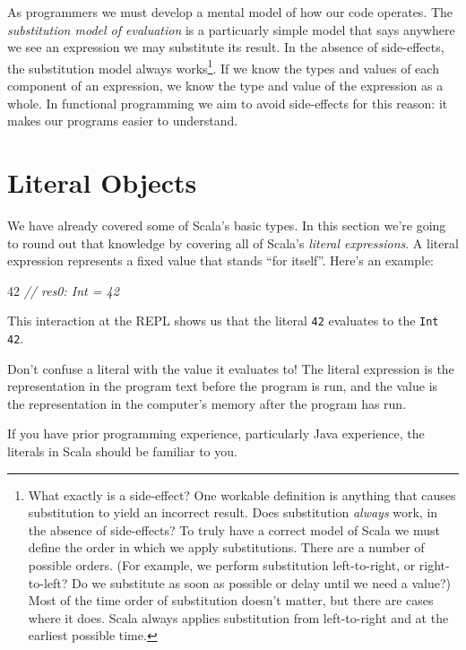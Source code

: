 \documentclass[11pt,a5paper,]{book}
\newenvironment{Shaded}{\begin{snugshade}}{\end{snugshade}}
\newcommand{\CommentTok}[1]{\textcolor[rgb]{0.56,0.35,0.01}{\textit{#1}}}
\newcommand{\DecValTok}[1]{\textcolor[rgb]{0.00,0.00,0.81}{#1}}
\begin{document}
As programmers we must develop a mental model of how our code operates.
The \emph{substitution model of evaluation} is a particuarly simple
model that says anywhere we see an expression we may substitute its
result. In the absence of side-effects, the substitution model always
works\footnote{What exactly is a side-effect? One workable definition is
  anything that causes substitution to yield an incorrect result. Does
  substitution \emph{always} work, in the absence of side-effects? To
  truly have a correct model of Scala we must define the order in which
  we apply substitutions. There are a number of possible orders. (For
  example, we perform substitution left-to-right, or right-to-left? Do
  we substitute as soon as possible or delay until we need a value?)
  Most of the time order of substitution doesn't matter, but there are
  cases where it does. Scala always applies substitution from
  left-to-right and at the earliest possible time.}. If we know the
types and values of each component of an expression, we know the type
and value of the expression as a whole. In functional programming we aim
to avoid side-effects for this reason: it makes our programs easier to
understand.

\hypertarget{literal-objects}{%
\section{Literal Objects}\label{literal-objects}}

We have already covered some of Scala's basic types. In this section
we're going to round out that knowledge by covering all of Scala's
\emph{literal expressions}. A literal expression represents a fixed
value that stands ``for itself''. Here's an example:

\begin{Shaded}
\begin{Highlighting}[]
\DecValTok{42}
\CommentTok{// res0: Int = 42}
\end{Highlighting}
\end{Shaded}

This interaction at the REPL shows us that the literal \texttt{42}
evaluates to the \texttt{Int} \texttt{42}.

Don't confuse a literal with the value it evaluates to! The literal
expression is the representation in the program text before the program
is run, and the value is the representation in the computer's memory
after the program has run.

If you have prior programming experience, particularly Java experience,
the literals in Scala should be familiar to you.
\end{document}
